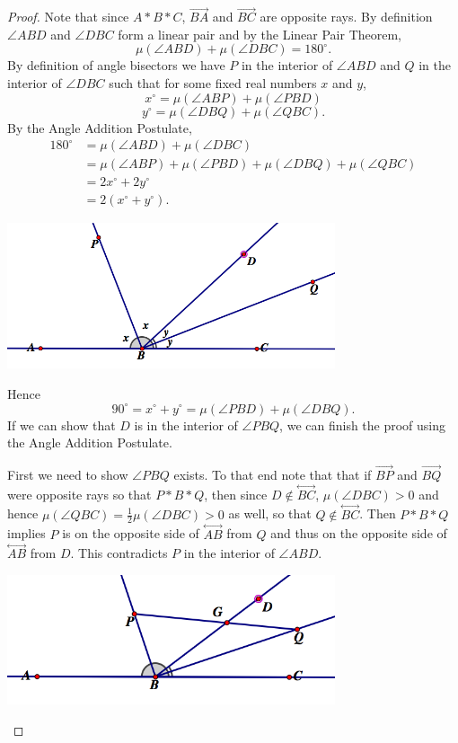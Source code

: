 \documentclass[12pt]{article}
\newcommand{\ray}[1]{\overrightarrow{#1}}
\renewcommand{\line}[1]{\stackrel{\longleftrightarrow}{#1}}
\renewcommand{\o}{\circ}
\begin{document}
\begin{enumerate}
\begin{proof} Note that since $A \ast B \ast C$, $\ray{BA}$ and $\ray{BC}$ are opposite rays. By definition $\angle ABD$ and $\angle DBC$ form a linear pair and by the Linear Pair Theorem, $$\mu(\angle ABD) + \mu(\angle DBC) = 180^\o.$$ By definition of angle bisectors we have $P$ in the interior of $\angle ABD$ and $Q$ in the interior of $\angle DBC$ such that for some fixed real numbers $x$ and $y$,
$$x^\o=\mu(\angle ABP) + \mu(\angle PBD)$$
$$y^\o=\mu(\angle DBQ) + \mu(\angle QBC).$$
By the Angle Addition Postulate,
\begin{align*} 180^\o &= \mu(\angle ABD) + \mu(\angle DBC)\\
				&=\mu(\angle ABP) + \mu(\angle PBD)+\mu(\angle DBQ) + \mu(\angle QBC)\\
				&=2x^\o + 2y^\o\\
				&=2(x^\o +y^\o).
\end{align*}
\begin{center}\includegraphics[width=3.8in]{2a.png}\end{center}
Hence $$90^\o=x^\o+y^\o = \mu(\angle PBD) + \mu(\angle DBQ).$$ If we can show that $D$ is in the interior of $\angle PBQ$, we can finish the proof using the Angle Addition Postulate.

First we need to show $\angle PBQ$ exists. To that end note that that if $\ray{BP}$ and $\ray{BQ}$ were opposite rays so that $P\ast B \ast Q$, then since $D\notin\line{BC}$, $\mu(\angle DBC)>0$ and hence $\mu(\angle QBC) = \frac{1}{2}\mu(\angle DBC) >0$ as well, so that $Q\notin\line{BC}$. Then $P\ast B\ast Q$ implies $P$ is on the opposite side of $\line{AB}$ from $Q$ and thus on the opposite side of $\line{AB}$ from $D$. This contradicts $P$ in the interior of $\angle ABD$.
 \begin{center}\includegraphics[width=3.8in]{2b.png}\end{center}
 

\end{proof}
\end{enumerate}
\end{document}
